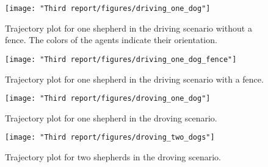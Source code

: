 \begin{figure}[!h]
    \hspace*{-0.5cm}
    \texttt{[image: "Third report/figures/driving\_one\_dog"]}
    \caption{Trajectory plot for one shepherd in the driving scenario without a fence.  The colors of the agents indicate their orientation.}
    \label{fig:one-shepherd-no-fence}
\end{figure}

\begin{figure}[!h]
    \hspace*{-0.5cm}
    \texttt{[image: "Third report/figures/driving\_one\_dog\_fence"]}
    \caption{Trajectory plot for one shepherd in the driving scenario with a fence.}
    \label{fig:one-shepherd-fence}
\end{figure}

\begin{figure}[!h]
    \hspace*{-0.5cm}
    \texttt{[image: "Third report/figures/droving\_one\_dog"]}
    \caption{Trajectory plot for one shepherd in the droving scenario.}
    \label{fig:single-shepherd}
\end{figure}

\begin{figure}[!h]
    \hspace*{-0.5cm}
    \texttt{[image: "Third report/figures/droving\_two\_dogs"]}
    \caption{Trajectory plot for two shepherds in the droving scenario.}
    \label{fig:two-shepherd}
\end{figure}